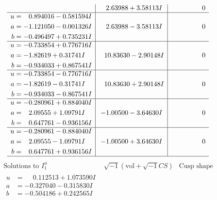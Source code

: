 \documentclass[1p]{elsarticle_modified}
\theoremstyle{definition}
\newcommand{\I}{\sqrt{-1}}
\begin{document}
$$\begin{array}{c|c|c}
 & \phantom{-}2.63988 + 3.58113 I & \phantom{-0.000000 } 0 \\ \hline\begin{aligned}
u &= \phantom{-}0.894016 - 0.581594 I \\
a &= -1.121050 - 0.001326 I \\
b &= -0.496497 + 0.735231 I\end{aligned}
 & \phantom{-}2.63988 - 3.58113 I & \phantom{-0.000000 } 0 \\ \hline\begin{aligned}
u &= -0.733854 + 0.776716 I \\
a &= -1.82619 + 0.31741 I \\
b &= -0.934033 + 0.867541 I\end{aligned}
 & \phantom{-}10.83630 - 2.90148 I & \phantom{-0.000000 } 0 \\ \hline\begin{aligned}
u &= -0.733854 - 0.776716 I \\
a &= -1.82619 - 0.31741 I \\
b &= -0.934033 - 0.867541 I\end{aligned}
 & \phantom{-}10.83630 + 2.90148 I & \phantom{-0.000000 } 0 \\ \hline\begin{aligned}
u &= -0.280961 + 0.884040 I \\
a &= \phantom{-}2.09555 + 1.09791 I \\
b &= \phantom{-}0.647761 - 0.936156 I\end{aligned}
 & -1.00500 - 3.64630 I & \phantom{-0.000000 } 0 \\ \hline\begin{aligned}
u &= -0.280961 - 0.884040 I \\
a &= \phantom{-}2.09555 - 1.09791 I \\
b &= \phantom{-}0.647761 + 0.936156 I\end{aligned}
 & -1.00500 + 3.64630 I & \phantom{-0.000000 } 0\\
 \hline 
 \end{array}$$\newpage$$\begin{array}{c|c|c}  
\text{Solutions to }I^u_{1}& \I (\text{vol} + \sqrt{-1}CS) & \text{Cusp shape}\\
 \hline 
\begin{aligned}
u &= \phantom{-}0.112513 + 1.073590 I \\
a &= -0.327040 - 0.315830 I \\
b &= -0.504186 + 0.242565 I\end{aligned}

\end{array}$$
\end{document}
